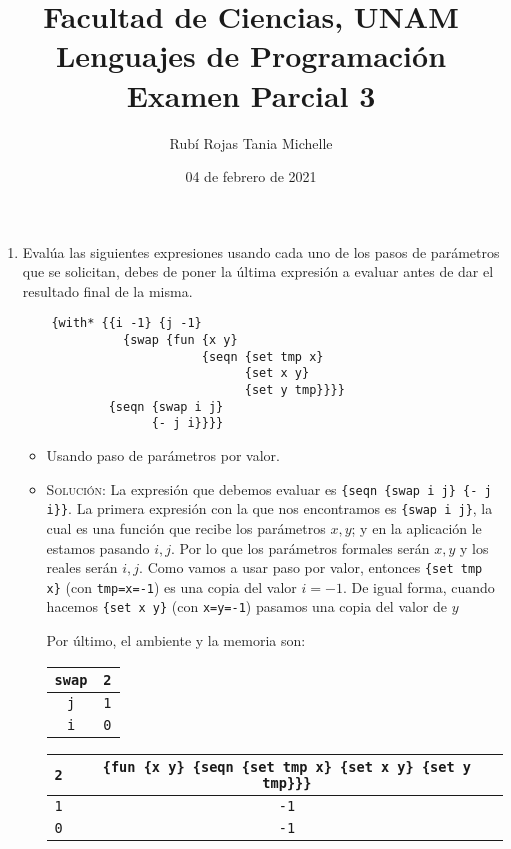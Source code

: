 \documentclass[letterpaper,11pt]{article}
\title{Facultad de Ciencias, UNAM \\ 
       Lenguajes de Programación\\ 
       Examen Parcial 3}
\author{Rubí Rojas Tania Michelle}
\date{04 de febrero de 2021}
\begin{document}
\maketitle

\begin{enumerate}
    \item Evalúa las siguientes expresiones usando cada uno de los pasos de 
    parámetros que se solicitan, debes de poner la última expresión a evaluar
    antes de dar el resultado final de la misma.
    \begin{verbatim}
    {with* {{i -1} {j -1}
              {swap {fun {x y}
                         {seqn {set tmp x}
                               {set x y}
                               {set y tmp}}}}
            {seqn {swap i j}
                  {- j i}}}}
    \end{verbatim}

    \begin{itemize}
        \item Usando paso de parámetros por valor.
        \item 
        \textsc{Solución:} La expresión que debemos evaluar es 
        \texttt{\{seqn \{swap i j\} \{- j i\}\}}. La primera expresión con 
        la que nos encontramos es \texttt{\{swap i j\}}, la cual es una 
        función que recibe los parámetros $x,y$; y en la aplicación le 
        estamos pasando $i,j$. Por lo que los parámetros formales serán 
        $x,y$ y los reales serán $i,j$. Como vamos a usar paso por valor, 
        entonces \texttt{\{set tmp x\}} (con \texttt{tmp=x=-1}) es una 
        copia del valor $i=-1$. De igual forma, cuando hacemos 
        \texttt{\{set x y\}} (con \texttt{x=y=-1}) pasamos una copia del 
        valor de $y$
        
        Por último, el ambiente y la memoria son:
        \begin{table}[h]
            \parbox{.30\linewidth}{
            \centering
            \begin{tabular}{|c|c|}
            \hline
            \texttt{swap} & \texttt{2} \\
            \hline
            \texttt{j} & \texttt{1} \\
            \hline
            \texttt{i} & \texttt{0} \\
            \hline
            \end{tabular}
            }
            \hfill
            \parbox{.67\linewidth}{
            \centering
            \begin{tabular}{|c|c|}
            \hline
            \texttt{2} & \texttt{\{fun \{x y\} \{seqn \{set tmp x\}
                  \{set x y\}
                  \{set y tmp\}\}\}} \\
            \hline
            \texttt{1} & \texttt{-1} \\
            \hline
            \texttt{0} & \texttt{-1} \\
            \hline
            \end{tabular}
            }
        \end{table}


\end{itemize}
\end{enumerate}
\end{document}
